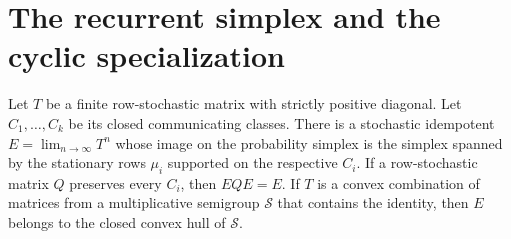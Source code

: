 \section{The recurrent simplex and the cyclic specialization}
\label{sec:r73-normal-form-supplement}

\begin{lemma}\label{lem:r73-lazy-convergence}
Let $T$ be a finite row-stochastic matrix with strictly positive diagonal.
Let $C_1,\ldots,C_k$ be its closed communicating classes. There is a
stochastic idempotent $E=\lim_{n\to\infty}T^n$ whose image on the probability
simplex is the simplex spanned by the stationary rows $\mu_i$ supported on
the respective $C_i$. If a row-stochastic matrix $Q$ preserves every $C_i$,
then $EQE=E$. If $T$ is a convex combination of matrices from a multiplicative
semigroup $\mathcal S$ that contains the identity, then $E$ belongs to the
closed convex hull of $\mathcal S$.
\end{lemma}
